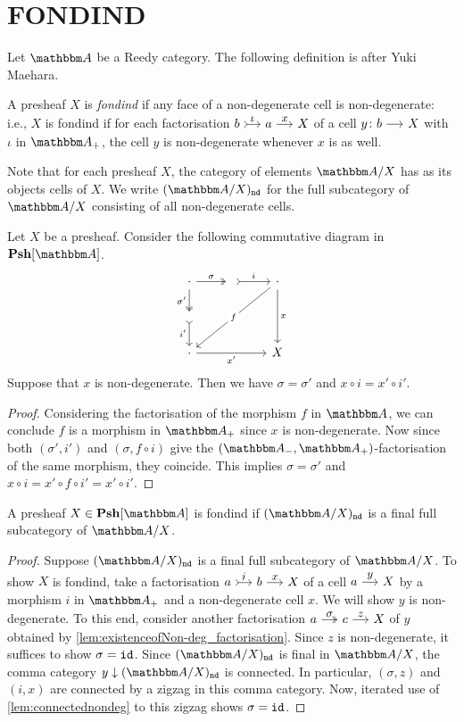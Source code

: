 \documentclass[a4paper,dvipsnames,11pt,backend=luatex]{amsart} %
\begin{document}
\section{FONDIND}
Let $\dgm{A}$ be a Reedy category.
The following definition is after Yuki Maehara.
\begin{definition}
	A presheaf $X$ is \emph{fondind} if any face of a non-degenerate cell is non-degenerate: i.e.,
	$X$ is fondind if
	for each factorisation $b\arr"\iota"[tail]a\arr"x"X$ of a cell $y\colon b \arr X$ with $\iota$ in $\dgm{A}_+$,
	the cell $y$ is non-degenerate whenever $x$ is as well.
\end{definition}
Note that for each presheaf $X$, the category of elements $\dgm{A}/X$ has as its objects cells of $X$.
We write $\ndcat{X}$ for the full subcategory of $\dgm{A}/X$ consisting of all non-degenerate cells.
\begin{lemma}
	\label{lem:connectednondeg}
	Let $X$ be a presheaf.
	Consider the following commutative diagram in $\Psh[\dgm{A}]$.
	\[
		\begin{tikzcd}
			\cdot
			\ar[d,two heads,"\sigma'"']
			\ar[r,two heads,"\sigma"]
				&
				{}
				\ar[r,tail,"i"]
					&
					\cdot
					\ar[dd,"x"]
					\ar[ddll,"f"description]
			\\
			{}
			\ar[d,tail,"i'"']
				&
				{}
					&
					{}
			\\
			\cdot
			\ar[rr,"x'"']
				&
				{}
					&
					X
		\end{tikzcd}
	\]
	Suppose that $x$ is non-degenerate.
	Then we have $\sigma=\sigma'$ and $x\circ i=x' \circ i'$.
\end{lemma}
\begin{proof}
	Considering the factorisation of the morphism $f$ in $\dgm{A}$, we can conclude $f$ is a morphism in $\dgm{A}_+$ since $x$ is non-degenerate.
	Now since both $(\sigma',i')$ and $(\sigma,f\circ i)$ give the $(\dgm{A}_-,\dgm{A}_+)$-factorisation of the same morphism,
	they coincide. This implies $\sigma=\sigma'$ and $x\circ i=x'\circ f\circ i'= x'\circ i'$.
\end{proof}
\begin{proposition}
	\label{prop:ndaf_fondind}
	A presheaf
	$X\in\Psh[\dgm{A}]$ is fondind
	if $\ndcat{X}$ is a final full subcategory of $\dgm{A}/X$.
\end{proposition}
\begin{proof}
	Suppose $\ndcat{X}$ is a final full subcategory of $\dgm{A}/X$.
	To show $X$ is fondind, take a factorisation $a\arr"i"[tail]b\arr"x"X$ of a cell $a\arr"y"X$ by a morphism $i$ in $\dgm{A}_+$
	and a non-degenerate cell $x$.
	We will show $y$ is non-degenerate.
	To this end, consider another factorisation $a\arr"\sigma"[two heads]c\arr"z"X$ of $y$ obtained by \cref{lem:existenceofNon-deg_factorisation}.
	Since $z$ is non-degenerate, it suffices to show $\sigma=\mathtt{id}$.
	Since $\ndcat{X}$ is final in $\dgm{A}/X$, the comma category $y\downarrow \ndcat{X}$ is connected.
	In particular, $(\sigma,z)$ and $(i,x)$ are connected by a zigzag in this comma category.
	Now, iterated use of \cref{lem:connectednondeg} to this zigzag shows $\sigma=\mathtt{id}$.
\end{proof}
\end{document}
